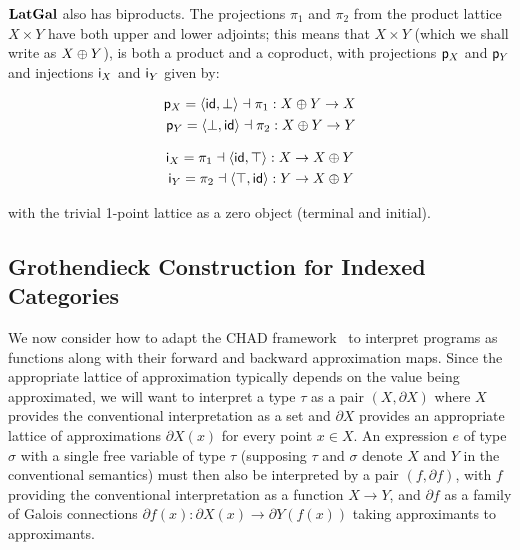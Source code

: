 $\mathbf{LatGal}$ also has biproducts. The projections $\pi_1$ and $\pi_2$ from the product lattice $X \times Y$ have
both upper and lower adjoints; this means that $X \times Y$ (which we shall write as $X \oplus Y$), is both a
product and a coproduct, with projections $\mathsf{p}_X$ and $\mathsf{p}_Y$ and injections $\mathsf{i}_X$ and $\mathsf{i}_Y$
given by:

\vspace{-4mm}
\begin{minipage}[t]{0.45\textwidth}
\begin{center}
\begin{align*}
   \mathsf{p}_X = \langle \mathsf{id}, \bot\rangle \dashv \pi_1: X \oplus Y \to X \\
   \mathsf{p}_Y = \langle \bot, \mathsf{id}\rangle \dashv \pi_2: X \oplus Y \to Y
\end{align*}
\end{center}
\end{minipage}%
\begin{minipage}[t]{0.45\textwidth}
\begin{center}
\begin{align*}
   \mathsf{i}_X = \pi_1 \dashv \langle \mathsf{id}, \top\rangle : X \to X \oplus Y \\
   \mathsf{i}_Y = \pi_2 \dashv \langle \top, \mathsf{id}\rangle: Y \to X \oplus Y
\end{align*}
\end{center}
\end{minipage}
\vspace{2mm}

\noindent with the trivial 1-point lattice as a zero object (terminal and initial).

\subsection{Grothendieck Construction for Indexed Categories}
\label{sec:Grothendieck}

We now consider how to adapt the CHAD framework~\cite{vákár22,nunes2023} to interpret programs as functions
along with their forward and backward approximation maps. Since the appropriate lattice of approximation
typically depends on the value being approximated, we will want to interpret a type $\tau$ as a pair $(X,
\partial X)$ where $X$ provides the conventional interpretation as a set and $\partial X$ provides an
appropriate lattice of approximations $\partial X(x)$ for every point $x \in X$. An expression $e$ of type
$\sigma$ with a single free variable of type $\tau$ (supposing $\tau$ and $\sigma$ denote $X$ and $Y$ in the
conventional semantics) must then also be interpreted by a pair $(f, \partial f)$, with $f$ providing the
conventional interpretation as a function $X \to Y$, and $\partial f$ as a family of Galois connections
$\partial f(x): \partial X(x) \to \partial Y(f(x))$ taking approximants to approximants.

